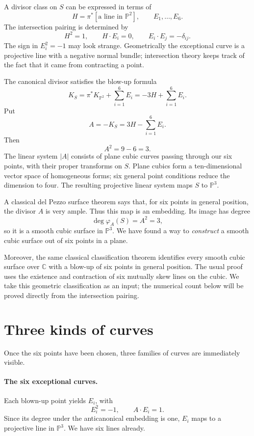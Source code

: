 A divisor class on \(S\) can be expressed in terms of
\[
 H=\pi^*[\text{a line in }\mathbb P^2],
 \qquad E_1,\ldots,E_6.
\]
The intersection pairing is determined by
\begin{equation}
 H^2=1,\qquad H\cdot E_i=0,\qquad
 E_i\cdot E_j=-\delta_{ij}.
 \label{eq:N20261109-intersection}
\end{equation}
The sign in \(E_i^2=-1\) may look strange. Geometrically the exceptional curve is a projective line with a negative normal bundle; intersection theory keeps track of the fact that it came from contracting a point.

The canonical divisor satisfies the blow-up formula
\[
 K_S=\pi^*K_{\mathbb P^2}+\sum_{i=1}^6E_i
     =-3H+\sum_{i=1}^6E_i.
\]
Put
\begin{equation}
 A=-K_S=3H-\sum_{i=1}^6E_i.
 \label{eq:N20261109-anticanonical}
\end{equation}
Then
\[
 A^2=9-6=3.
\]
The linear system \(|A|\) consists of plane cubic curves passing through our six points, with their proper transforms on \(S\). Plane cubics form a ten-dimensional vector space of homogeneous forms; six general point conditions reduce the dimension to four. The resulting projective linear system maps \(S\) to \(\mathbb P^3\).

A classical del Pezzo surface theorem says that, for six points in general position, the divisor \(A\) is very ample. Thus this map is an embedding. Its image has degree
\[
 \deg\varphi_A(S)=A^2=3,
\]
so it is a smooth cubic surface in \(\mathbb P^3\). We have found a way to \emph{construct} a smooth cubic surface out of six points in a plane.

Moreover, the same classical classification theorem identifies every smooth cubic surface over \(\mathbb C\) with a blow-up of six points in general position. The usual proof uses the existence and contraction of six mutually skew lines on the cubic. We take this geometric classification as an input; the numerical count below will be proved directly from the intersection pairing.

\section{Three kinds of curves}

Once the six points have been chosen, three families of curves are immediately visible.

\paragraph{The six exceptional curves.}
Each blown-up point yields \(E_i\), with
\[
 E_i^2=-1,\qquad A\cdot E_i=1.
\]
Since its degree under the anticanonical embedding is one, \(E_i\) maps to a projective line in \(\mathbb P^3\). We have six lines already.


